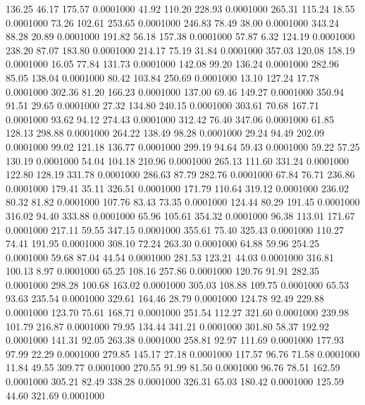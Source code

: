  136.25   46.17  175.57   0.0001000
  41.92  110.20  228.93   0.0001000
 265.31  115.24   18.55   0.0001000
  73.26  102.61  253.65   0.0001000
 246.83   78.49   38.00   0.0001000
 343.24   88.28   20.89   0.0001000
 191.82   56.18  157.38   0.0001000
  57.87    6.32  124.19   0.0001000
 238.20   87.07  183.80   0.0001000
 214.17   75.19   31.84   0.0001000
 357.03  120.08  158.19   0.0001000
  16.05   77.84  131.73   0.0001000
 142.08   99.20  136.24   0.0001000
 282.96   85.05  138.04   0.0001000
  80.42  103.84  250.69   0.0001000
  13.10  127.24   17.78   0.0001000
 302.36   81.20  166.23   0.0001000
 137.00   69.46  149.27   0.0001000
 350.94   91.51   29.65   0.0001000
  27.32  134.80  240.15   0.0001000
 303.61   70.68  167.71   0.0001000
  93.62   94.12  274.43   0.0001000
 312.42   76.40  347.06   0.0001000
  61.85  128.13  298.88   0.0001000
 264.22  138.49   98.28   0.0001000
  29.24   94.49  202.09   0.0001000
  99.02  121.18  136.77   0.0001000
 299.19   94.64   59.43   0.0001000
  59.22   57.25  130.19   0.0001000
  54.04  104.18  210.96   0.0001000
 265.13  111.60  331.24   0.0001000
 122.80  128.19  331.78   0.0001000
 286.63   87.79  282.76   0.0001000
  67.84   76.71  236.86   0.0001000
 179.41   35.11  326.51   0.0001000
 171.79  110.64  319.12   0.0001000
 236.02   80.32   81.82   0.0001000
 107.76   83.43   73.35   0.0001000
 124.44   80.29  191.45   0.0001000
 316.02   94.40  333.88   0.0001000
  65.96  105.61  354.32   0.0001000
  96.38  113.01  171.67   0.0001000
 217.11   59.55  347.15   0.0001000
 355.61   75.40  325.43   0.0001000
 110.27   74.41  191.95   0.0001000
 308.10   72.24  263.30   0.0001000
  64.88   59.96  254.25   0.0001000
  59.68   87.04   44.54   0.0001000
 281.53  123.21   44.03   0.0001000
 316.81  100.13    8.97   0.0001000
  65.25  108.16  257.86   0.0001000
 120.76   91.91  282.35   0.0001000
 298.28  100.68  163.02   0.0001000
 305.03  108.88  109.75   0.0001000
  65.53   93.63  235.54   0.0001000
 329.61  164.46   28.79   0.0001000
 124.78   92.49  229.88   0.0001000
 123.70   75.61  168.71   0.0001000
 251.54  112.27  321.60   0.0001000
 239.98  101.79  216.87   0.0001000
  79.95  134.44  341.21   0.0001000
 301.80   58.37  192.92   0.0001000
 141.31   92.05  263.38   0.0001000
 258.81   92.97  111.69   0.0001000
 177.93   97.99   22.29   0.0001000
 279.85  145.17   27.18   0.0001000
 117.57   96.76   71.58   0.0001000
  11.84   49.55  309.77   0.0001000
 270.55   91.99   81.50   0.0001000
  96.76   78.51  162.59   0.0001000
 305.21   82.49  338.28   0.0001000
 326.31   65.03  180.42   0.0001000
 125.59   44.60  321.69   0.0001000
